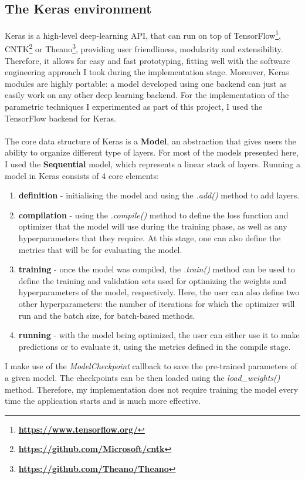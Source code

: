 	\subsection{The Keras environment} \label{Section: impl/ml/ecosys}
	Keras is a high-level deep-learning API, that can run on top of TensorFlow\footnote{\textbf{\url{https://www.tensorflow.org/}}}, CNTK\footnote{\textbf{\url{https://github.com/Microsoft/cntk}}} or Theano\footnote{\textbf{\url{https://github.com/Theano/Theano}}}, providing user friendliness, modularity and extensibility. Therefore, it allows for easy and fast prototyping, fitting well with the software engineering approach I took during the implementation stage. Moreover, Keras modules are highly portable: a model developed using one backend can just as easily work on any other deep learning backend. For the implementation of the parametric techniques I experimented as part of this project, I used the TensorFlow backend for Keras. 
	\\ \\
	The core data structure of Keras is a \textbf{Model}, an abstraction that gives users the ability to organize different type of layers. For most of the models presented here, I used the \textbf{Sequential} model, which represents a linear stack of layers. Running a model in Keras consists of 4 core elements:
	\begin{enumerate}
		\item \textbf{definition} - initialising the model and using the \textit{.add()} method to add layers.
		\item \textbf{compilation} - using the \textit{.compile()} method to define the loss function and optimizer that the model will use during the training phase, as well as any hyperparameters that they require. At this stage, one can also define the metrics that will be for evaluating the model. 
		\item \textbf{training} - once the model was compiled, the \textit{.train()} method can be used to define the training and validation sets used for optimizing the weights and hyperparameters of the model, respectively. Here, the user can also define two other hyperparameters: the number of iterations for which the optimizer will run and the batch size, for batch-based methods. 
		\item \textbf{running} - with the model being optimized, the user can either use it to make predictions or to evaluate it, using the metrics defined in the compile stage. 
	\end{enumerate}
	I make use of the \textit{ModelCheckpoint} callback to save the pre-trained parameters of a given model. The checkpoints can be then loaded using the \textit{load\_weights()} method. Therefore, my implementation does not require training the model every time the application starts and is much more effective. 
	
